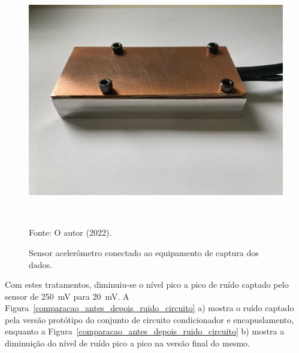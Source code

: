 \documentclass[
	12pt,				
	oneside,			
	a4paper,			
	english,			
	brazil,			
	]{abntex2ppgsi}
\begin{document}
\begin{figure}[H]
\centering
\caption {Sensor acelerômetro conectado ao equipamento de captura dos dados.}
\includegraphics[width=\textwidth,height=110mm,keepaspectratio]{encapsulamento_novo_externo} \\
Fonte: O autor (2022).
\label{encapsulamento_novo_externo}
\end{figure} 

Com estes tratamentos, diminuiu-se o nível pico a pico de ruído captado pelo sensor de {\SI{250}{\milli\volt}} para {\SI{20}{\milli\volt}}. A Figura~\ref{comparacao_antes_depois_ruido_circuito} a) mostra o ruído captado pela versão protótipo do conjunto de circuito condicionador e encapuslamento, enquanto a Figura~\ref{comparacao_antes_depois_ruido_circuito} b) mostra a diminuição do nível de ruído pico a pico na versão final do mesmo.
\end{document}
